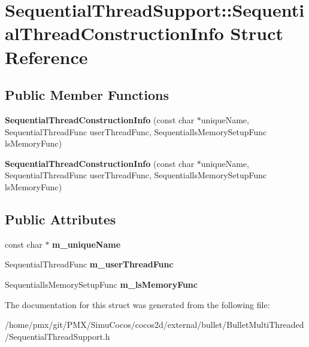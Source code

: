 \hypertarget{structSequentialThreadSupport_1_1SequentialThreadConstructionInfo}{}\section{Sequential\+Thread\+Support\+:\+:Sequential\+Thread\+Construction\+Info Struct Reference}
\label{structSequentialThreadSupport_1_1SequentialThreadConstructionInfo}
\subsection*{Public Member Functions}
\begin{DoxyCompactItemize}
\item 
\mbox{\label{structSequentialThreadSupport_1_1SequentialThreadConstructionInfo_a72715bc63af605f9b87b16559262d3fc}} 
{\bfseries Sequential\+Thread\+Construction\+Info} (const char $\ast$unique\+Name, Sequential\+Thread\+Func user\+Thread\+Func, Sequentialls\+Memory\+Setup\+Func ls\+Memory\+Func)
\item 
\mbox{\label{structSequentialThreadSupport_1_1SequentialThreadConstructionInfo_a72715bc63af605f9b87b16559262d3fc}} 
{\bfseries Sequential\+Thread\+Construction\+Info} (const char $\ast$unique\+Name, Sequential\+Thread\+Func user\+Thread\+Func, Sequentialls\+Memory\+Setup\+Func ls\+Memory\+Func)
\end{DoxyCompactItemize}
\subsection*{Public Attributes}
\begin{DoxyCompactItemize}
\item 
\mbox{\label{structSequentialThreadSupport_1_1SequentialThreadConstructionInfo_a5851b99dd9efa629a17a2d05da994091}} 
const char $\ast$ {\bfseries m\+\_\+unique\+Name}
\item 
\mbox{\label{structSequentialThreadSupport_1_1SequentialThreadConstructionInfo_a11137c6bbe94036ed8711277092fcb18}} 
Sequential\+Thread\+Func {\bfseries m\+\_\+user\+Thread\+Func}
\item 
\mbox{\label{structSequentialThreadSupport_1_1SequentialThreadConstructionInfo_aa6f4b48dfebf248c31fb0fb14873c0d6}} 
Sequentialls\+Memory\+Setup\+Func {\bfseries m\+\_\+ls\+Memory\+Func}
\end{DoxyCompactItemize}


The documentation for this struct was generated from the following file\+:\begin{DoxyCompactItemize}
\item 
/home/pmx/git/\+P\+M\+X/\+Simu\+Cocos/cocos2d/external/bullet/\+Bullet\+Multi\+Threaded/Sequential\+Thread\+Support.\+h\end{DoxyCompactItemize}
